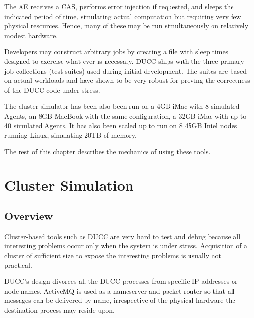     The AE receives a CAS, performs error injection if requested, and
    sleeps the indicated period of time, simulating actual computation
    but requiring very few physical resources.  Hence, many of these 
    may be run simultaneously on relatively modest hardware.

    Developers may construct arbitrary jobs by creating a file with
    sleep times designed to exercise what ever is necessary.  DUCC 
    ships with the three primary job collections (test suites) used
    during initial development.  The suites are based on actual 
    workloads and have shown to be very robust for proving the correctness
    of the DUCC code under stress.

    The cluster simulator has been also been run on a 4GB iMac with 8 simulated Agents, an 8GB MacBook with
    the same configuration, a 32GB iMac with up to 40 simulated Agents. It has also been scaled
    up to run on 8 45GB Intel nodes running Linux, simulating 20TB of memory.

    The rest of this chapter describes the mechanics of using these tools.

\section{Cluster Simulation}

    \subsection{Overview}
    Cluster-based tools such as DUCC are very hard to test and debug
    because all interesting problems occur only when the system is
    under stress.  Acquisition of a cluster of sufficient size to 
    expose the interesting problems is usually not practical.

    DUCC's design divorces all the DUCC processes from specific IP
    addresses or node names.  ActiveMQ is used as a nameserver and
    packet router so that all messages can be delivered by name,
    irrespective of the physical hardware the destination process
    may reside upon.  

